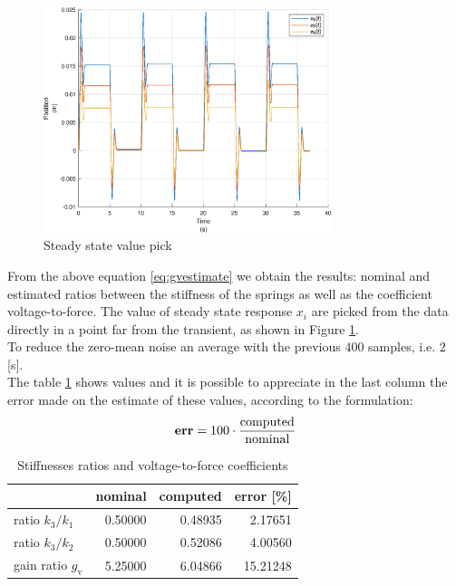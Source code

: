 \begin{figure}[htb]
	\centering
	\includegraphics[width=0.75\textwidth]{steadystate}
	\caption{Steady state value pick}
	\label{fig:steadystate}
\end{figure}
From the above equation \eqref{eq:gvestimate} we obtain the results: nominal 
and estimated ratios between the stiffness of the springs as well as the 
coefficient voltage-to-force.
The value of steady state response \(x_{i}\) are picked from the data directly 
in a point far from the transient, as shown in Figure \ref{fig:steadystate}.\\ 
To reduce the zero-mean noise an average with the previous \(400\) samples, i.e.
\(2\) [\si{\second}].
\\The table \ref{tab:error} shows values and it is possible to appreciate in the 
last column the error made on the estimate of these values, according to the 
formulation:
\begin{equation}
	\label{eq:ratioerror}
	\text{\textbf{err}} = 100\cdot\frac{\text{computed}}{\text{nominal}}
\end{equation}
%
\begin{table}[ht]
\centering
	\begin{tabular}{lrrr}
	\toprule
						& nominal & computed & error [\%] \\
 	\midrule
 		ratio $k_{3}/k_{1}$	& 0.50000 & 0.48935 &	2.17651 \\
		ratio $k_{3}/k_{2}$	& 0.50000 & 0.52086 & 	4.00560 \\
		gain ratio $g_{\text{v}}$ & 5.25000 & 6.04866 &  15.21248	\\
	\bottomrule
	\end{tabular}
	\caption{Stiffnesses ratios and voltage-to-force coefficients}
	\label{tab:error}
\end{table}
%
